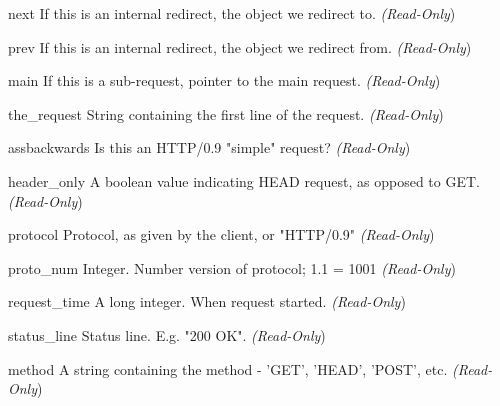 \begin{memberdesc}[request]{next}
If this is an internal redirect, the  object we redirect to. 
\emph{(Read-Only})
\end{memberdesc}

\begin{memberdesc}[request]{prev}
If this is an internal redirect, the  object we redirect from.
\emph{(Read-Only})
\end{memberdesc}

\begin{memberdesc}[request]{main}
If this is a sub-request, pointer to the main request. 
\emph{(Read-Only})
\end{memberdesc}

\begin{memberdesc}[request]{the_request}
String containing the first line of the request.
\emph{(Read-Only})
\end{memberdesc}

\begin{memberdesc}[request]{assbackwards}
Is this an HTTP/0.9 "simple" request? 
\emph{(Read-Only})
\end{memberdesc}

\begin{memberdesc}[request]{header_only}
A boolean value indicating HEAD request, as opposed to GET. 
\emph{(Read-Only})
\end{memberdesc}

\begin{memberdesc}[request]{protocol}
Protocol, as given by the client, or "HTTP/0.9"
\emph{(Read-Only})
\end{memberdesc}

\begin{memberdesc}[request]{proto_num}
Integer. Number version of protocol; 1.1 = 1001 
\emph{(Read-Only})
\end{memberdesc}

\begin{memberdesc}[request]{request_time}
A long integer. When request started.
\emph{(Read-Only})
\end{memberdesc}

\begin{memberdesc}[request]{status_line}
Status line. E.g. "200 OK". 
\emph{(Read-Only})
\end{memberdesc}

\begin{memberdesc}[request]{method}
A string containing the method - 'GET', 'HEAD', 'POST', etc.
\emph{(Read-Only})
\end{memberdesc}

